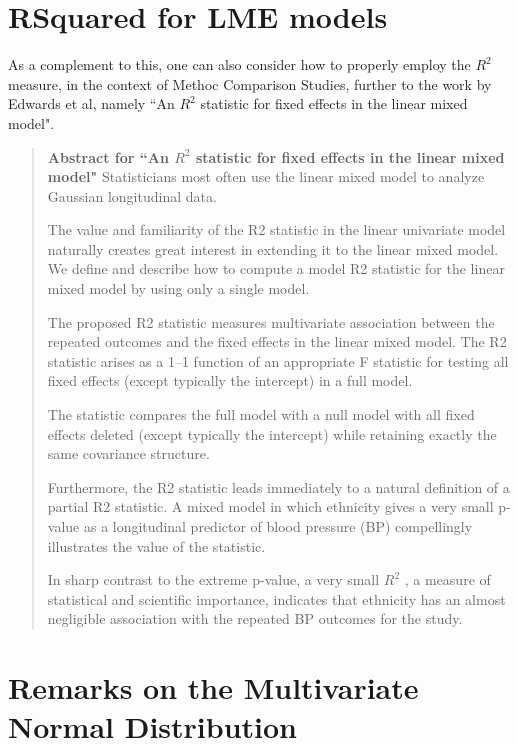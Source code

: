 \documentclass[12pt, a4paper]{report}
\theoremstyle{plain}
\theoremstyle{definition}
\theoremstyle{remark}
\begin{document}
\newpage	
	
	
	\section{RSquared for LME models}
	
	As a complement to this, one can also consider how to properly employ the $R^2$ measure, in the context of Methoc Comparison Studies, further to the work by Edwards et al, namely ``An $R^2$ statistic for fixed effects in the linear mixed model".
	
	\begin{framed}
		
		\begin{quote}
			\textbf{Abstract for ``An $R^2$ statistic for fixed effects in the linear mixed model"}
			Statisticians most often use the linear mixed model to analyze Gaussian longitudinal data. 
			
			The value and familiarity of the R2 statistic in the linear univariate model naturally creates great interest in extending it to the linear mixed model. We define and describe how to compute a model R2 statistic for the linear mixed model by using only a single model. 
			
			The proposed R2 statistic measures multivariate association between the repeated outcomes and the fixed effects in the linear mixed model. The R2 statistic arises as a 1–1 function of an appropriate F statistic for testing all fixed effects (except typically the intercept) in a full model. 
			
			The statistic compares the full model with a null model with all fixed effects deleted (except typically the intercept) while retaining exactly the same covariance structure. 
			
			Furthermore, the R2 statistic leads immediately to a natural definition of a partial R2 statistic. A mixed model in which ethnicity gives a very small p-value as a longitudinal predictor of blood pressure (BP) compellingly illustrates the value of the statistic. 
			
			In sharp contrast to the extreme p-value, a very small $R^2$ , a measure of statistical and scientific importance, indicates that ethnicity has an almost negligible association with the repeated BP outcomes for the study.
		\end{quote}
	\end{framed}
	
	\section{Remarks on the Multivariate Normal Distribution}
	
\end{document}
